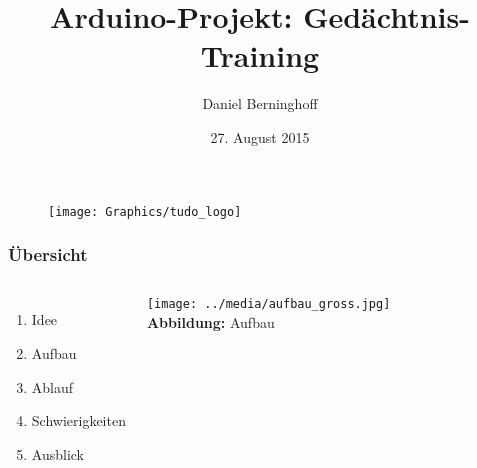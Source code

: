 \documentclass[xcolor=dvipsnames,10pt]{beamer}
\title[Arduino-Projekt]{\texorpdfstring{Arduino-Projekt: Gedächtnis-Training}{}} %
\author{Daniel Berninghoff}
\date[27. August 2015]{27. August 2015}
\def\gray{\color[rgb]{0.45,0.45,0.45}}
\begin{document}
\begin{frame}[noframenumbering]
\titlepage


\begin{figure}		%
	\texttt{[image: Graphics/tudo\_logo]}
\end{figure}



\end{frame}









\begin{frame}\frametitle{Übersicht}
	\begin{columns}[c]
		\begin{enumerate} \itemsep3ex
			\item Idee
			\item Aufbau
			\item Ablauf
			\item Schwierigkeiten
			\item Ausblick
		\end{enumerate}
		
		\texttt{[image: ../media/aufbau\_gross.jpg]}\\
		 {\small \textbf{Abbildung:} Aufbau}
	\end{columns}


\end{frame}
\end{document}

